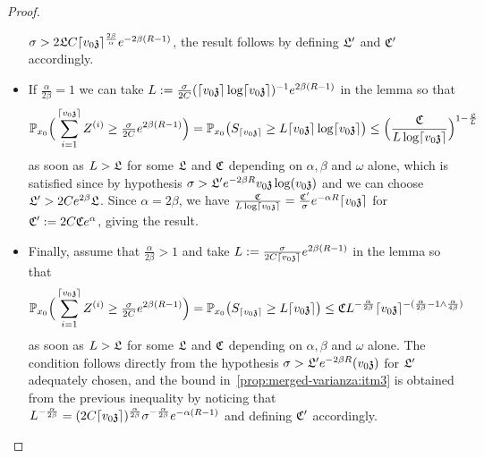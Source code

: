 \begin{proof}
\begin{itemize}
$\sigma > 2\auxl C\lceil v_0\ss\rceil^{\frac{2\beta}{\alpha}}e^{-2\beta (R-1)}$, the result follows by defining $\auxl'$ and $\auxc'$ accordingly.
\item If $\frac{\alpha}{2\beta}=1$ we can take $L:=\tfrac{\sigma}{2C}(\lceil v_0\ss\rceil\log \lceil v_0\ss\rceil)^{-1} e^{2\beta(R-1)}$ in the lemma so that
\[\PP_{x_0}\Big(\sum_{i=1}^{\lceil v_0\ss\rceil}Z^{(i)}\ge\tfrac{\sigma}{2C}e^{2\beta(R-1)}\Big)=\PP_{x_0}\big(S_{\lceil v_0\ss\rceil}\ge L \lceil v_0\ss\rceil\log \lceil v_0\ss\rceil\big)\leq \Big(\frac{\auxc}{L\log \lceil v_0\ss\rceil}\Big)^{1-\frac{\auxl}{L}}\]
as soon as $L>\auxl$ for some $\auxl$ and $\auxc$ depending on $\alpha,\beta$ and $\omega$ alone, which is satisfied since by hypothesis $\sigma > \auxl'e^{-2\beta R}v_0\ss\log(v_0\ss)$ and we can choose $\auxl'>2Ce^{2\beta}\auxl$. Since $\alpha=2\beta$, we have $\tfrac{\auxc}{L\log\lceil v_0\ss\rceil}=\frac{\auxc'}{\sigma}e^{-\alpha R}\lceil v_0\ss\rceil $ for $\auxc':=2C\auxc e^{\alpha}$, giving the result.
\item Finally, assume that $\frac{\alpha}{2\beta}>1$ and take $L:=\tfrac{\sigma}{2C\lceil v_0\ss\rceil} e^{2\beta(R-1)}$ in the lemma so that
\[\PP_{x_0}\Big(\sum_{i=1}^{\lceil v_0\ss\rceil}Z^{(i)}\ge\tfrac{\sigma}{2C}e^{2\beta(R-1)}\Big)=\PP_{x_0}\big(S_{\lceil v_0\ss\rceil}\ge L \lceil v_0\ss\rceil\big)\leq \auxc L^{-\frac{\alpha}{2\beta}}\lceil v_0\ss\rceil^{-(\frac{\alpha}{2\beta}-1\wedge\frac{\alpha}{4\beta})}\]
as soon as $L> \auxl$ for some $\auxl$ and $\auxc$ depending on $\alpha,\beta$ and $\omega$ alone. The condition follows directly from the hypothesis $\sigma>\auxl' e^{-2\beta R}(v_0\ss)$ for $\auxl'$ adequately chosen, and the bound in~\eqref{prop:merged-varianza:itm3} is obtained from the previous inequality by noticing that $L^{-\frac{\alpha}{2\beta}}=(2C\lceil v_0\ss\rceil)^{\frac{\alpha}{2\beta}}\sigma^{-\frac{\alpha}{2\beta}}e^{-\alpha (R-1)}$ and defining $\auxc'$ accordingly.
\end{itemize}
\end{proof}

